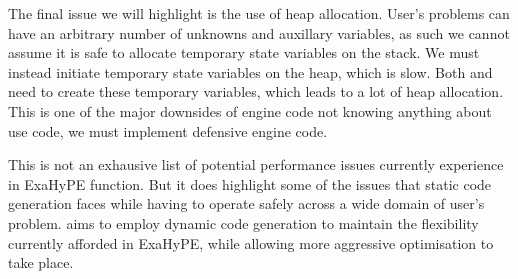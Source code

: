 The final issue we will highlight is the use of heap allocation.
User's problems can have an arbitrary number of unknowns and auxillary variables, 
as such we cannot assume it is safe to allocate temporary state variables on the stack.
We must instead initiate temporary state variables on the heap, which is slow.
Both  and  need to create these temporary variables, which leads to a lot of heap allocation.
This is one of the major downsides of engine code not knowing anything about use code, we must implement defensive engine code.


This is not an exhausive list of potential performance issues currently experience in ExaHyPE  function.
But it does highlight some of the issues that static code generation faces while having to operate safely across a wide domain of user's problem.
\phlat aims to employ dynamic code generation to maintain the flexibility currently afforded in ExaHyPE, while allowing more aggressive optimisation to take place.
